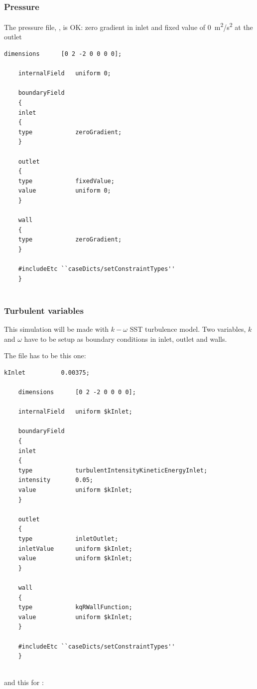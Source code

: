 \documentclass[
    parskip=half,      %
    DIV=12,            %
    headings=normal,   %
    fontsize=11pt,     %
    english            %
]{scrartcl}
\begin{document}
\subsubsection{Pressure}

The pressure file, , is OK: zero gradient in inlet and fixed value of
\qty{0}{m^2/s^2} at the outlet

\begin{lstlisting}[style=openfoam]
	dimensions      [0 2 -2 0 0 0 0];
	
	internalField   uniform 0;
	
	boundaryField
	{
	inlet
	{
	type            zeroGradient;
	}
	
	outlet
	{
	type            fixedValue;
	value           uniform 0;
	}
	
	wall
	{
	type            zeroGradient;
	}
	
	#includeEtc ``caseDicts/setConstraintTypes''
	}
	
\end{lstlisting}

\subsubsection{Turbulent variables}

This simulation will be made with $k-\omega$ SST turbulence model. Two variables, $k$
and $\omega$ have to be setup as boundary conditions in inlet, outlet and walls.

The  file has to be this one:

\begin{lstlisting}[style=openfoam]
	kInlet          0.00375;
	
	dimensions      [0 2 -2 0 0 0 0];
	
	internalField   uniform $kInlet;
	
	boundaryField
	{
	inlet
	{
	type            turbulentIntensityKineticEnergyInlet;
	intensity       0.05;
	value           uniform $kInlet;
	}
	
	outlet
	{
	type            inletOutlet;
	inletValue      uniform $kInlet;
	value           uniform $kInlet;
	}
	
	wall
	{
	type            kqRWallFunction;
	value           uniform $kInlet;
	}
	
	#includeEtc ``caseDicts/setConstraintTypes''
	}
	
\end{lstlisting}

and this for :
\end{document}
